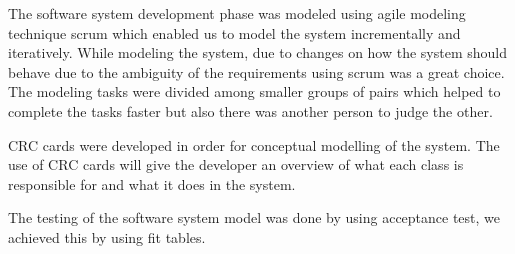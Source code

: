 The software system development phase was modeled using agile modeling technique scrum which enabled us to model the system incrementally and iteratively. While modeling the system, due to changes on how the system should behave due to the ambiguity of the requirements using scrum was a great choice.  The modeling tasks were divided among smaller groups of pairs which helped to complete the tasks faster but also there was another person to judge the other. 

CRC cards were developed in order for conceptual modelling of the system.  The use of CRC cards will give the developer an overview of what each class is responsible for and what it does in the system. 

The testing of the software system model was done by using acceptance test, we achieved this by using fit tables. 

